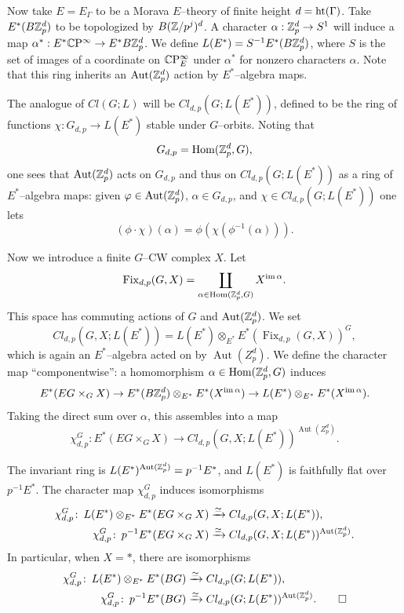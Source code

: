 Now take $E = E_\Gamma$ to be a Morava $E$--theory of finite height $d = \operatorname{ht}(\Gamma)$.  Take $E^*(B\mathbb Z_p^d)$ to be topologized by $B(\mathbb Z/p^j)^d$.  A character $\alpha: \mathbb Z_p^d \to S^1$ will induce a map $\alpha^*: E^* \mathbb{C}\mathrm P^\infty \to E^* B\mathbb Z_p^d$.  We define $L(E^*) = S^{-1} E^*(B\mathbb Z_p^d)$, where $S$ is the set of images of a coordinate on $\mathbb{C}\mathrm P^\infty_E$ under $\alpha^*$ for nonzero characters $\alpha$.  Note that this ring inherits an $\operatorname{Aut}(\mathbb Z_p^d)$ action by $E^*$--algebra maps.

The analogue of $Cl(G; L)$ will be $Cl_{d,p}(G; L(E^*))$, defined to be the ring of functions $\chi: G_{d, p} \to L(E^*)$ stable under $G$--orbits.  Noting that \[G_{d,p} = \operatorname{Hom}(\mathbb Z_p^d, G),\] one sees that $\operatorname{Aut}(\mathbb Z_p^d)$ acts on $G_{d,p}$ and thus on $Cl_{d,p}(G; L(E^*))$ as a ring of $E^*$--algebra maps: given $\varphi \in \operatorname{Aut}(\mathbb Z_p^d)$, $\alpha \in G_{d,p}$, and $\chi \in Cl_{d,p}(G; L(E^*))$ one lets \[(\phi \cdot \chi)(\alpha) = \phi(\chi(\phi^{-1}(\alpha))).\]

Now we introduce a finite $G$--CW complex $X$.  Let \[\operatorname{Fix}_{d, p}(G, X) = \coprod_{\alpha \in \operatorname{Hom}(\mathbb Z_p^d, G)} X^{\operatorname{im} \alpha}.\]  This space has commuting actions of $G$ and $\operatorname{Aut}(\mathbb Z_p^d)$.  We set \[Cl_{d, p}(G, X; L(E^*)) = L(E^*) \otimes_{E^*} E^*(\operatorname{Fix}_{d,p}(G, X))^G,\] which is again an $E^*$--algebra acted on by $\operatorname{Aut}(Z_p^d)$.  We define the character map ``componentwise'': a homomorphism $\alpha \in \operatorname{Hom}(\mathbb Z_p^d, G)$ induces \[E^*(EG \times_G X) \to E^*(B\mathbb Z_p^d) \otimes_{E^*} E^*(X^{\operatorname{im} \alpha}) \to L(E^*) \otimes_{E^*} E^*(X^{\operatorname{im} \alpha}).\]  Taking the direct sum over $\alpha$, this assembles into a map \[\chi_{d,p}^G: E^*(EG \times_G X) \to Cl_{d,p}(G, X; L(E^*))^{\operatorname{Aut}(Z_p^d)}.\]
\begin{theorem}
The invariant ring is $L(E^*)^{\operatorname{Aut}(\mathbb Z_p^d)} = p^{-1} E^*$, and $L(E^*)$ is faithfully flat over $p^{-1} E^*$.  The character map $\chi_{d,p}^G$ induces isomorphisms
\begin{align*}
\chi_{d,p}^G \colon\thinspace L(E^*) \otimes_{E^*} E^*(EG \times_G X) & \xrightarrow{\simeq} Cl_{d,p}(G, X; L(E^*)), \\
\chi_{d,p}^G \colon\thinspace p^{-1} E^*(EG \times_G X) & \xrightarrow{\simeq} Cl_{d,p}(G, X; L(E^*))^{\operatorname{Aut}(\mathbb Z_p^d)}.
\end{align*}
In particular, when $X = *$, there are isomorphisms
\begin{align*}
\chi_{d,p}^G \colon\thinspace L(E^*) \otimes_{E^*} E^*(BG) & \xrightarrow{\simeq} Cl_{d,p}(G; L(E^*)), \\
\chi_{d,p}^G \colon\thinspace p^{-1} E^*(BG) & \xrightarrow{\simeq} Cl_{d,p}(G; L(E^*))^{\operatorname{Aut}(\mathbb Z_p^d)}. \qed
\end{align*}
\end{theorem}

